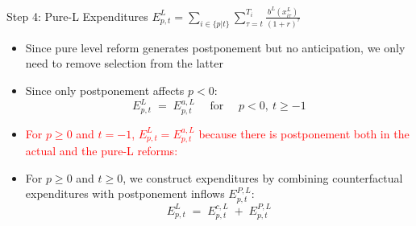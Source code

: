 \begin{frame}{Step 4: Pure-L Expenditures $E^{L}_{p,t}=\sum_{i \in \{p|t\}}\sum_{\tau=t}^{T_i} \frac{b^L(x^L_{i\tau})}{(1+r)^{\tau}}$}
\begin{itemize}
    \item Since pure level reform generates {postponement} but no {anticipation}, we only need to remove selection from the latter

    \item Since only postponement affects $p<0$:
    \[
        {
        E^{L}_{p,t} \;=\; E^{a,L}_{p,t}
        }\quad \text{ for }\quad p<0,\ t\geq -1
    \]
    \item \textcolor{red}{For $p\geq 0$ and $t=-1$,  $E^{L}_{p,t}=E^{a,L}_{p,t}$ because there is postponement both in the actual and the pure-L reforms:}
    \item For $p\geq 0$ and $t\geq 0$, we construct expenditures by combining counterfactual expenditures with postponement inflows $E^{P,L}_{p,t}$:
    \[
        {
        E^{L}_{p,t}
        \;=\;
        E^{c,L}_{p,t}
        \;+\;
        E^{P,L}_{p,t}
        }
    \]
\end{itemize}
\end{frame}

